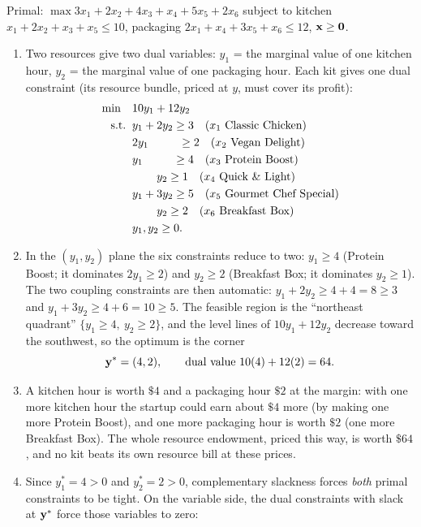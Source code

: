 
Primal: $\max 3x_1 + 2x_2 + 4x_3 + x_4 + 5x_5 + 2x_6$ subject to kitchen $x_1 + 2x_2 + x_3 + x_5 \le 10$, packaging $2x_1 + x_4 + 3x_5 + x_6 \le 12$, $\mathbf{x} \ge \mathbf{0}$.

\begin{enumerate}
\item Two resources give two dual variables: $y_1$ = the marginal value of one kitchen hour, $y_2$ = the marginal value of one packaging hour. Each kit gives one dual constraint (its resource bundle, priced at $y$, must cover its profit):
\[
\begin{aligned}
\min \quad & 10y_1 + 12y_2 \\
\st & y_1 + 2y_2 \ge 3 \quad (x_1 \text{ Classic Chicken}) \\
& 2y_1 \phantom{{}+2y_2} \ge 2 \quad (x_2 \text{ Vegan Delight}) \\
& y_1 \phantom{{}+2y_2} \ge 4 \quad (x_3 \text{ Protein Boost}) \\
& \phantom{y_1 + {}} y_2 \ge 1 \quad (x_4 \text{ Quick \& Light}) \\
& y_1 + 3y_2 \ge 5 \quad (x_5 \text{ Gourmet Chef Special}) \\
& \phantom{y_1 + {}} y_2 \ge 2 \quad (x_6 \text{ Breakfast Box}) \\
& y_1, y_2 \ge 0 .
\end{aligned}
\]
\item In the $(y_1, y_2)$ plane the six constraints reduce to two: $y_1 \ge 4$ (Protein Boost; it dominates $2y_1 \ge 2$) and $y_2 \ge 2$ (Breakfast Box; it dominates $y_2 \ge 1$). The two coupling constraints are then automatic: $y_1 + 2y_2 \ge 4 + 4 = 8 \ge 3$ and $y_1 + 3y_2 \ge 4 + 6 = 10 \ge 5$. The feasible region is the ``northeast quadrant'' $\{y_1 \ge 4,\ y_2 \ge 2\}$, and the level lines of $10y_1 + 12y_2$ decrease toward the southwest, so the optimum is the corner
\[
\mathbf{y}^* = (4, 2), \qquad \text{dual value } 10(4) + 12(2) = 64 .
\]
\item A kitchen hour is worth $\$4$ and a packaging hour $\$2$ at the margin: with one more kitchen hour the startup could earn about $\$4$ more (by making one more Protein Boost), and one more packaging hour is worth $\$2$ (one more Breakfast Box). The whole resource endowment, priced this way, is worth $\$64$, and no kit beats its own resource bill at these prices.
\item Since $y_1^* = 4 > 0$ and $y_2^* = 2 > 0$, complementary slackness forces \emph{both} primal constraints to be tight. On the variable side, the dual constraints with slack at $\mathbf{y}^*$ force those variables to zero:

\end{enumerate}
